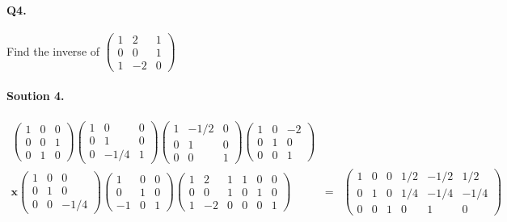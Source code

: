 \documentclass[11pt]{article}
\begin{document}
\paragraph{Q4.}Find the inverse of 
$\begin{pmatrix}
	1 & 2 & 1\\
	0 & 0 & 1\\
	1 & -2 & 0
\end{pmatrix}$

\paragraph{Soution 4.}
\begin{eqnarray*}
\begin{pmatrix}
1 & 0 & 0\\
0 & 0 & 1\\
0 & 1 & 0
\end{pmatrix}
\begin{pmatrix}
1 & 0 & 0\\
0 & 1 & 0\\
0 & -1/4 & 1
\end{pmatrix}
\begin{pmatrix}
1 & -1/2 & 0\\
0 & 1 & 0\\
0 & 0 & 1
\end{pmatrix}
\begin{pmatrix}
1 & 0 & -2\\
0 & 1 & 0\\
0 & 0 & 1
\end{pmatrix}
\\ \mathbf{x}
\begin{pmatrix}
1 & 0 & 0\\
0 & 1 & 0\\
0 & 0 & -1/4
\end{pmatrix}
\begin{pmatrix}
1 & 0 & 0\\
0 & 1 & 0\\
-1 & 0 & 1
\end{pmatrix}
\left(\begin{array}{ccc|ccc}  
	1 & 2 & 1 & 1 & 0 & 0\\
    0 & 0 & 1 & 0 & 1 & 0\\
    1 & -2 & 0 & 0 & 0 & 1
\end{array}\right)
&=&
\left(\begin{array}{ccc|ccc}  
	1 & 0 & 0 & 1/2 & -1/2 & 1/2\\
    0 & 1 & 0 & 1/4 & -1/4 & -1/4\\
    0 & 0 & 1 & 0 & 1 & 0
\end{array}\right)
\end{eqnarray*}
\end{document}
